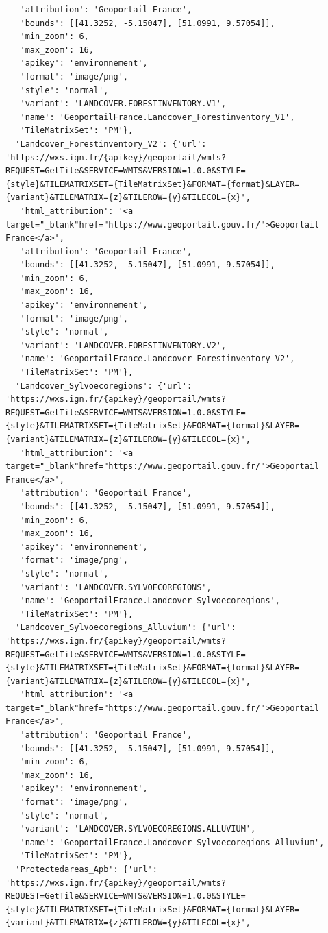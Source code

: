 \documentclass[
  letterpaper,
  DIV=11,
  numbers=noendperiod]{scrreprt}
\begin{document}
\begin{verbatim}
   'attribution': 'Geoportail France',
   'bounds': [[41.3252, -5.15047], [51.0991, 9.57054]],
   'min_zoom': 6,
   'max_zoom': 16,
   'apikey': 'environnement',
   'format': 'image/png',
   'style': 'normal',
   'variant': 'LANDCOVER.FORESTINVENTORY.V1',
   'name': 'GeoportailFrance.Landcover_Forestinventory_V1',
   'TileMatrixSet': 'PM'},
  'Landcover_Forestinventory_V2': {'url': 'https://wxs.ign.fr/{apikey}/geoportail/wmts?REQUEST=GetTile&SERVICE=WMTS&VERSION=1.0.0&STYLE={style}&TILEMATRIXSET={TileMatrixSet}&FORMAT={format}&LAYER={variant}&TILEMATRIX={z}&TILEROW={y}&TILECOL={x}',
   'html_attribution': '<a target="_blank"href="https://www.geoportail.gouv.fr/">Geoportail France</a>',
   'attribution': 'Geoportail France',
   'bounds': [[41.3252, -5.15047], [51.0991, 9.57054]],
   'min_zoom': 6,
   'max_zoom': 16,
   'apikey': 'environnement',
   'format': 'image/png',
   'style': 'normal',
   'variant': 'LANDCOVER.FORESTINVENTORY.V2',
   'name': 'GeoportailFrance.Landcover_Forestinventory_V2',
   'TileMatrixSet': 'PM'},
  'Landcover_Sylvoecoregions': {'url': 'https://wxs.ign.fr/{apikey}/geoportail/wmts?REQUEST=GetTile&SERVICE=WMTS&VERSION=1.0.0&STYLE={style}&TILEMATRIXSET={TileMatrixSet}&FORMAT={format}&LAYER={variant}&TILEMATRIX={z}&TILEROW={y}&TILECOL={x}',
   'html_attribution': '<a target="_blank"href="https://www.geoportail.gouv.fr/">Geoportail France</a>',
   'attribution': 'Geoportail France',
   'bounds': [[41.3252, -5.15047], [51.0991, 9.57054]],
   'min_zoom': 6,
   'max_zoom': 16,
   'apikey': 'environnement',
   'format': 'image/png',
   'style': 'normal',
   'variant': 'LANDCOVER.SYLVOECOREGIONS',
   'name': 'GeoportailFrance.Landcover_Sylvoecoregions',
   'TileMatrixSet': 'PM'},
  'Landcover_Sylvoecoregions_Alluvium': {'url': 'https://wxs.ign.fr/{apikey}/geoportail/wmts?REQUEST=GetTile&SERVICE=WMTS&VERSION=1.0.0&STYLE={style}&TILEMATRIXSET={TileMatrixSet}&FORMAT={format}&LAYER={variant}&TILEMATRIX={z}&TILEROW={y}&TILECOL={x}',
   'html_attribution': '<a target="_blank"href="https://www.geoportail.gouv.fr/">Geoportail France</a>',
   'attribution': 'Geoportail France',
   'bounds': [[41.3252, -5.15047], [51.0991, 9.57054]],
   'min_zoom': 6,
   'max_zoom': 16,
   'apikey': 'environnement',
   'format': 'image/png',
   'style': 'normal',
   'variant': 'LANDCOVER.SYLVOECOREGIONS.ALLUVIUM',
   'name': 'GeoportailFrance.Landcover_Sylvoecoregions_Alluvium',
   'TileMatrixSet': 'PM'},
  'Protectedareas_Apb': {'url': 'https://wxs.ign.fr/{apikey}/geoportail/wmts?REQUEST=GetTile&SERVICE=WMTS&VERSION=1.0.0&STYLE={style}&TILEMATRIXSET={TileMatrixSet}&FORMAT={format}&LAYER={variant}&TILEMATRIX={z}&TILEROW={y}&TILECOL={x}',

\end{verbatim}
\end{document}
